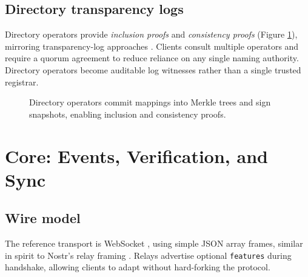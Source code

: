 \documentclass[conference]{IEEEtran}
\begin{document}
\subsection{Directory transparency logs}
Directory operators provide \emph{inclusion proofs} and \emph{consistency proofs} (Figure \ref{fig:directory}), mirroring transparency-log approaches \cite{rfc6962}. Clients consult multiple operators and require a quorum agreement to reduce reliance on any single naming authority. Directory operators become auditable log witnesses rather than a single trusted registrar.

\begin{figure}[t]
\centering
{}
\caption{Directory operators commit mappings into Merkle trees and sign snapshots, enabling inclusion and consistency proofs.}
\label{fig:directory}
\end{figure}

\section{Core: Events, Verification, and Sync}
\subsection{Wire model}
The reference transport is WebSocket \cite{rfc6455}, using simple JSON array frames, similar in spirit to Nostr's relay framing \cite{wei2024nostr}. Relays advertise optional \texttt{features} during handshake, allowing clients to adapt without hard-forking the protocol.
\end{document}
